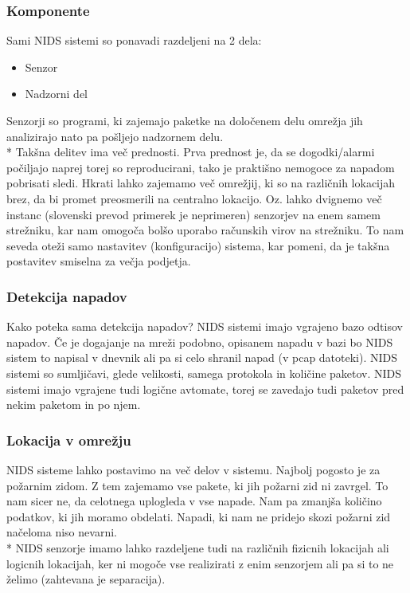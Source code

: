 \documentclass[12pt]{article}
\begin{document}
\subsubsection{Komponente} %

Sami NIDS sistemi so ponavadi razdeljeni na 2 dela:
\begin{itemize}
    \item Senzor
    \item Nadzorni del
\end{itemize}

Senzorji so programi, ki zajemajo paketke na določenem delu omrežja jih analizirajo nato pa pošljejo nadzornem delu.
\\*
Takšna delitev ima več prednosti. Prva prednost je, da se dogodki/alarmi počiljajo naprej torej so reproducirani, tako je praktišno nemogoce za napadom pobrisati sledi.
Hkrati lahko zajemamo več omrežjij, ki so na različnih lokacijah brez, da bi promet preosmerili na centralno lokacijo.
Oz. lahko dvignemo več instanc (slovenski prevod primerek je neprimeren) senzorjev na enem samem strežniku, kar nam omogoča bolšo uporabo računskih virov na strežniku.
To nam seveda oteži samo nastavitev (konfiguracijo) sistema, kar pomeni, da je takšna postavitev smiselna za večja podjetja.


\subsubsection{Detekcija napadov} %

Kako poteka sama detekcija napadov? 
NIDS sistemi imajo vgrajeno bazo odtisov napadov. Če je dogajanje na mreži podobno, opisanem napadu v bazi
bo NIDS sistem to napisal v dnevnik ali pa si celo shranil napad (v pcap datoteki). 
NIDS sistemi so sumljičavi, glede velikosti, samega protokola in količine paketov.
NIDS sistemi imajo vgrajene tudi logične avtomate, torej se zavedajo tudi paketov pred nekim paketom in po njem.


\subsubsection{Lokacija v omrežju} %

NIDS sisteme lahko postavimo na več delov v sistemu. Najbolj pogosto je za požarnim zidom.
Z tem zajemamo vse pakete, ki jih požarni zid ni zavrgel. To nam sicer ne, da celotnega uplogleda v vse napade.
Nam pa zmanjša količino podatkov, ki jih moramo obdelati. Napadi, ki nam ne pridejo skozi požarni zid načeloma niso nevarni.
\\*
NIDS senzorje imamo lahko razdeljene tudi na različnih fizicnih lokacijah ali logicnih lokacijah, ker ni mogoče vse realizirati z enim senzorjem ali pa si to ne želimo (zahtevana je separacija).
\end{document}
